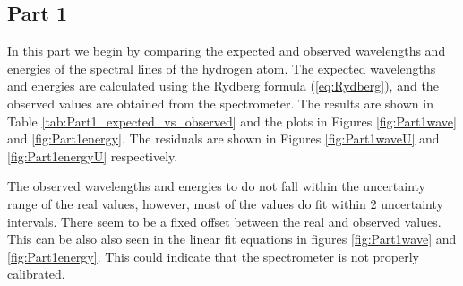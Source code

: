 
\subsection{Part 1}

In this part we begin by comparing the expected and observed wavelengths and energies of the spectral lines of the hydrogen atom. The expected wavelengths and energies are calculated using the Rydberg formula (\ref{eq:Rydberg}), and the observed values are obtained from the spectrometer. The results are shown in Table \ref{tab:Part1_expected_vs_observed} and the plots in Figures \ref{fig:Part1wave} and \ref{fig:Part1energy}.
The residuals are shown in Figures \ref{fig:Part1waveU} and \ref{fig:Part1energyU} respectively.

The observed wavelengths and energies to do not fall within the uncertainty range of the real values, however, most of the values do fit within 2 uncertainty intervals. There seem to be a fixed offset between the real and observed values. This can be also also seen in the linear fit equations in figures \ref{fig:Part1wave} and \ref{fig:Part1energy}.
This could indicate that the spectrometer is not properly calibrated.

